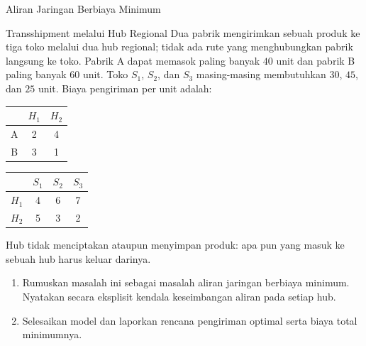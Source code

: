 \begin{ex}{Aliran Jaringan Berbiaya Minimum}{}
\begin{center}
\par{}\label{fig:modeling-sums-continued-tikz12}%

   \end{center}
\exrefs{\S\ref{sec:min-cost-network-flow}}
   \end{ex}

\begin{ex}{Transshipment melalui Hub Regional}{}
\label{ex:transshipment-hubs}
 Dua pabrik mengirimkan sebuah produk ke tiga toko melalui dua hub regional; tidak ada rute yang menghubungkan pabrik langsung ke toko. Pabrik A dapat memasok paling banyak $40$ unit dan pabrik B paling banyak $60$ unit. Toko $S_1$, $S_2$, dan $S_3$ masing-masing membutuhkan $30$, $45$, dan $25$ unit. Biaya pengiriman per unit adalah:
\begin{center}
\begin{tabular}{c|c|c}
 & $H_1$ & $H_2$ \\
\hline
A & 2 & 4 \\
B & 3 & 1 \\
\end{tabular}
\qquad
\begin{tabular}{c|c|c|c}
 & $S_1$ & $S_2$ & $S_3$ \\
\hline
$H_1$ & 4 & 6 & 7 \\
$H_2$ & 5 & 3 & 2 \\
\end{tabular}
\par{}\label{tab:modeling-sums-continued-tab05}%

\end{center}
Hub tidak menciptakan ataupun menyimpan produk: apa pun yang masuk ke sebuah hub harus keluar darinya.
\begin{enumerate}
\item Rumuskan masalah ini sebagai masalah aliran jaringan berbiaya minimum. Nyatakan secara eksplisit kendala keseimbangan aliran pada setiap hub.
\item Selesaikan model dan laporkan rencana pengiriman optimal serta biaya total minimumnya.
\end{enumerate}
\exrefs{\S\ref{sec:min-cost-network-flow}}
\end{ex}

